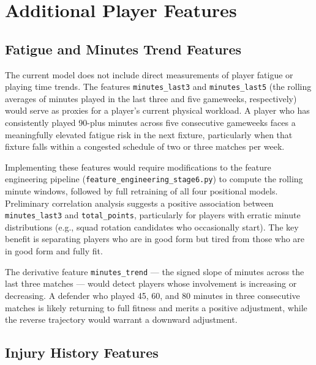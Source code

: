 
\section{Additional Player Features}

\subsection{Fatigue and Minutes Trend Features}

The current model does not include direct measurements of player fatigue or playing time trends. The features \texttt{minutes\_last3} and \texttt{minutes\_last5} (the rolling averages of minutes played in the last three and five gameweeks, respectively) would serve as proxies for a player's current physical workload. A player who has consistently played 90-plus minutes across five consecutive gameweeks faces a meaningfully elevated fatigue risk in the next fixture, particularly when that fixture falls within a congested schedule of two or three matches per week.

Implementing these features would require modifications to the feature engineering pipeline (\texttt{feature\_engineering\_stage6.py}) to compute the rolling minute windows, followed by full retraining of all four positional models. Preliminary correlation analysis suggests a positive association between \texttt{minutes\_last3} and \texttt{total\_points}, particularly for players with erratic minute distributions (e.g., squad rotation candidates who occasionally start). The key benefit is separating players who are in good form but tired from those who are in good form and fully fit.

The derivative feature \texttt{minutes\_trend} — the signed slope of minutes across the last three matches — would detect players whose involvement is increasing or decreasing. A defender who played 45, 60, and 80 minutes in three consecutive matches is likely returning to full fitness and merits a positive adjustment, while the reverse trajectory would warrant a downward adjustment.

\subsection{Injury History Features}

